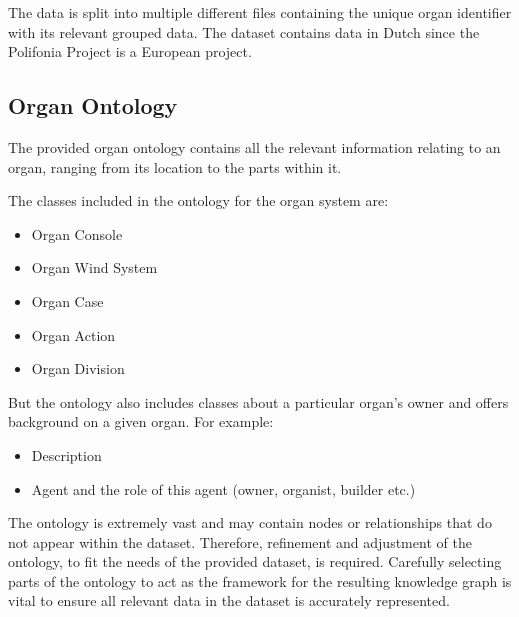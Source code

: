 The data is split into multiple different files containing the unique organ identifier with its relevant grouped data. The dataset contains data in Dutch since the Polifonia Project is a European project.

\subsection{Organ Ontology}
\hspace{0.5cm} The provided organ ontology \cite{organontology} contains all the relevant information relating to an organ, ranging from its location to the parts within it. 

\noindent The classes included in the ontology for the organ system are:

\vspace{-0.15cm}
\begin{itemize}
    \itemsep0em 
    \item Organ Console
    \vspace{-0.1cm}
    \item Organ Wind System
    \vspace{-0.1cm}
    \item Organ Case
    \vspace{-0.1cm}
    \item Organ Action
    \vspace{-0.1cm}
    \item Organ Division
\end{itemize}
\vspace{-0.15cm}

\noindent  But the ontology also includes classes about a particular organ's owner and offers background on a given organ. For example:

\vspace{-0.15cm}
\begin{itemize}
    \itemsep0em 
\item Description
\vspace{-0.1cm}
\item Agent and the role of this agent (owner, organist, builder etc.)
\end{itemize}
\vspace{-0.15cm}

The ontology is extremely vast and may contain nodes or relationships that do not appear within the dataset. Therefore, refinement and adjustment of the ontology, to fit the needs of the provided dataset, is required. Carefully selecting parts of the ontology to act as the framework for the resulting knowledge graph is vital to ensure all relevant data in the dataset is accurately represented. 

